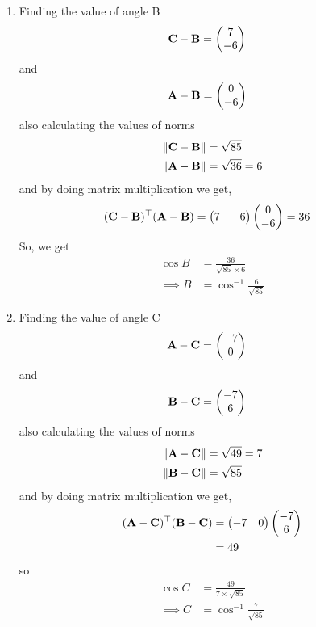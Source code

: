 \documentclass[11pt]{book}
\begin{document}
\begin{enumerate}[label=\thesection.\arabic*.,ref=\thesection.\theenumi]
\begin{enumerate}
\item Finding the value of angle B
\begin{align}
 \mathbf{C}-\mathbf{B} &=\begin{pmatrix}7\\-6\end{pmatrix}
\end{align}
and 
\begin{align}
 \mathbf{A}-\mathbf{B} &= \begin{pmatrix}0\\-6\end{pmatrix}
\end{align}
also calculating the values of norms
\begin{align}
 \left\lVert\mathbf{C}-\mathbf{B}\right\rVert &= \sqrt{85} \\
 \left\lVert\mathbf{A}-\mathbf{B}\right\rVert &= \sqrt{36} = 6 
\end{align}
and by doing matrix multiplication we get,
\begin{align}
\begin{split}
 (\mathbf{C}-\mathbf{B})^{\top}(\mathbf{A}-\mathbf{B}) &= \begin{pmatrix}7&-6\end{pmatrix}\begin{pmatrix}0\\-6\end{pmatrix} = 36
\end{split}
\end{align}
So, we get 
\begin{align}
	\cos{B} &= \frac{36}{\sqrt{85} \times 6}\\
 \implies B& = \cos^{-1}{\frac{6}{\sqrt{85}}}
\end{align}

\item Finding the value of angle C
\begin{align}
 \mathbf{A}-\mathbf{C} &=\begin{pmatrix}-7\\0\end{pmatrix}
\end{align}
and 
\begin{align}
 \mathbf{B}-\mathbf{C} &= \begin{pmatrix}-7\\6\end{pmatrix}
\end{align}
also calculating the values of norms
\begin{align}
 \left\lVert\mathbf{A}-\mathbf{C}\right\rVert &= \sqrt{49} = 7 \\
	\left\lVert\mathbf{B}-\mathbf{C}\right\rVert &= \sqrt{85}
\end{align}
and by doing matrix multiplication we get,
\begin{align}
\begin{split}
 (\mathbf{A}-\mathbf{C})^{\top}(\mathbf{B}-\mathbf{C}) &= \begin{pmatrix}-7&0\end{pmatrix}\begin{pmatrix}-7\\6\end{pmatrix}\\
 &= 49
\end{split}
\end{align}
so 
\begin{align}
	\cos{C} &= \frac{49}{7 \times {\sqrt{85}} }\\
 \implies C &= \cos^{-1}{\frac{7}{\sqrt{85}}}
\end{align}
\end{enumerate}

\latexprintindex

\end{enumerate}
\end{document}
